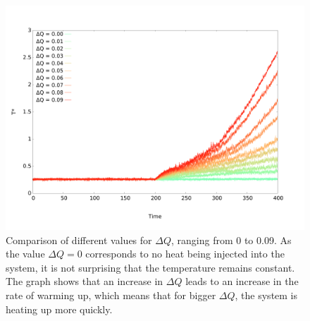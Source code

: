\documentclass[12pt]{article}
\begin{document}
\begin{figure}[h]
    \begin{center}
        \includegraphics[scale=0.4]{images/ehex_temp_dq.pdf}
        \caption{Comparison of different values for $\Delta Q$, ranging from 0 to 0.09. As the value $\Delta Q=0$ corresponds to no heat being
        injected into the system, it is not surprising that the temperature remains constant. The graph shows that an increase in $\Delta Q$ leads to
    an increase in the rate of warming up, which means that for bigger $\Delta Q$, the system is heating up more quickly.}
        \label{fig:ehex_dq}
    \end{center}
\end{figure}
\end{document}
